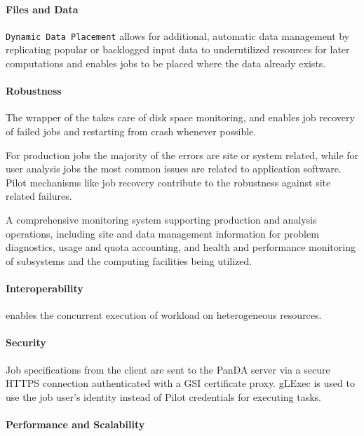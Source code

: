 \documentclass{sig-alternate}
\begin{document}
\paragraph{Files and Data}

\texttt{\panda Dynamic Data Placement} \cite{maeno_pd2p:_2012} allows for
additional, automatic data management by replicating popular or backlogged
input data to underutilized resources for later computations and enables jobs
to be placed where the data already exists.

\paragraph{Robustness}

The wrapper of the \pilot takes care of disk space monitoring, and enables job
recovery of failed jobs and restarting from crash whenever possible.

For production jobs the majority of the errors are site or system related,
while for user analysis jobs the most common issues are related to application
software.  Pilot mechanisms like job recovery contribute to the robustness
against site related failures.

A comprehensive monitoring system supporting production and analysis
operations, including site and data management information for problem
diagnostics, usage and quota accounting, and health and performance monitoring
of \panda subsystems and the computing facilities being utilized.

\paragraph{Interoperability}

\panda enables the concurrent execution of workload on heterogeneous resources.

\paragraph{Security}

Job specifications from the client are sent to the PanDA server via a secure
HTTPS connection authenticated with a GSI certificate proxy.
gLExec is used to use the job user's identity instead of Pilot credentials for
executing tasks.

\paragraph{Performance and Scalability}
\end{document}
